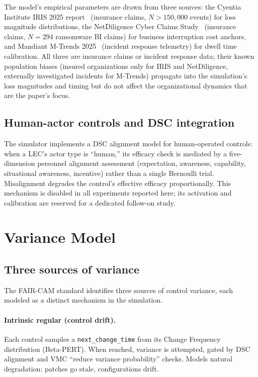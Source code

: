 \documentclass[11pt,a4paper]{article}
\begin{document}
The model's empirical parameters are drawn from three sources: the Cyentia Institute IRIS 2025 report~\citep{IRIS2025} (insurance claims, $N{>}150{,}000$ events) for loss magnitude distributions, the NetDiligence Cyber Claims Study~\citep{NetDiligence2024} (insurance claims, $N{=}294$ ransomware BI claims) for business interruption cost anchors, and Mandiant M-Trends 2025~\citep{MTrends2025} (incident response telemetry) for dwell time calibration. All three are insurance claims or incident response data; their known population biases (insured organizations only for IRIS and NetDiligence, externally investigated incidents for M-Trends) propagate into the simulation's loss magnitudes and timing but do not affect the organizational dynamics that are the paper's focus.

\subsection{Human-actor controls and DSC integration}

The simulator implements a DSC alignment model for human-operated controls: when a LEC's actor type is ``human,'' its efficacy check is mediated by a five-dimension personnel alignment assessment (expectation, awareness, capability, situational awareness, incentive) rather than a single Bernoulli trial. Misalignment degrades the control's effective efficacy proportionally. This mechanism is disabled in all experiments reported here; its activation and calibration are reserved for a dedicated follow-on study.


\section{Variance Model}
\label{sec:variance}

\subsection{Three sources of variance}

The FAIR-CAM standard identifies three sources of control variance, each modeled as a distinct mechanism in the simulation.

\paragraph{Intrinsic regular (control drift).} Each control samples a \texttt{next\_change\_time} from its Change Frequency distribution (Beta-PERT). When reached, variance is attempted, gated by DSC alignment and VMC ``reduce variance probability'' checks. Models natural degradation: patches go stale, configurations drift.
\end{document}
